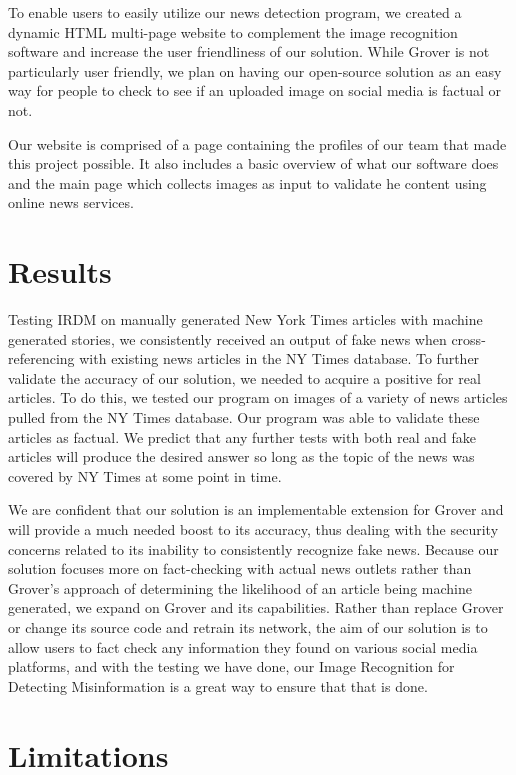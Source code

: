 \documentclass[conference]{IEEEtran}
\begin{document}
To enable users to easily utilize our news detection program, we created a dynamic HTML multi-page website to complement the image recognition software and increase the user friendliness of our solution. While Grover is not particularly user friendly, we plan on having our open-source solution as an easy way for people to check to see if an uploaded image on social media is factual or not.

Our website is comprised of a page containing the profiles of our team that made this project possible. It also includes a basic overview of what our software does and the main page which collects images as input to validate he content using online news services. 

\section{Results}

Testing IRDM on manually generated New York Times articles with machine generated stories, we consistently received an output of fake news when cross-referencing with existing news articles in the NY Times database. To further validate the accuracy of our solution, we needed to acquire a positive for real articles. To do this, we tested our program on images of a variety of news articles pulled from the NY Times database. Our program was able to validate these articles as factual. We predict that any further tests with both real and fake articles will produce the desired answer so long as the topic of the news was covered by NY Times at some point in time. 

We are confident that our solution is an implementable extension for Grover and will provide a much needed boost to its accuracy, thus dealing with the security concerns related to its inability to consistently recognize fake news. Because our solution focuses more on fact-checking with actual news outlets rather than Grover's approach of determining the likelihood of an article being machine generated, we expand on Grover and its capabilities. Rather than replace Grover or change its source code and retrain its network, the aim of our solution is to allow users to fact check any information they found on various social media platforms, and with the testing we have done, our Image Recognition for Detecting Misinformation is a great way to ensure that that is done. 

\section{Limitations}
\end{document}
